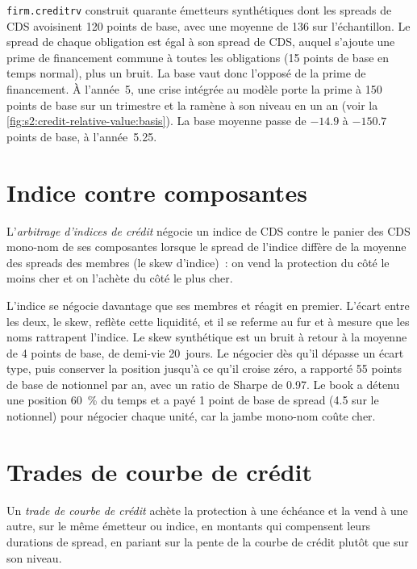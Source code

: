 \texttt{firm.creditrv} construit quarante émetteurs synthétiques dont les spreads de CDS avoisinent 120 points de base, avec une moyenne de 136 sur l'échantillon. Le spread de chaque obligation est égal à son
spread de CDS, auquel s'ajoute une prime de financement commune à toutes les obligations (15 points de base en temps normal), plus un bruit. La base vaut donc l'opposé de la prime de financement.
À l'année~5, une crise intégrée au modèle porte la prime à 150 points de base sur un trimestre et la ramène à son niveau en un an
(voir la \cref{fig:s2:credit-relative-value:basis}). La base moyenne passe de $-14.9$ à $-150.7$ points de base, à l'année~5.25.

\section{Indice contre composantes}

\begin{definition}\label{def:s2:credit-relative-value:index}
L'\emph{arbitrage d'indices de crédit} négocie un indice de CDS contre le panier des CDS mono-nom de ses composantes lorsque le spread de l'indice diffère de la
moyenne des spreads des membres (le skew d'indice)~: on vend la protection du côté le moins cher et on l'achète du côté le plus cher.
\end{definition}

L'indice se négocie davantage que ses membres et réagit en premier. L'écart entre les deux, le skew, reflète cette liquidité, et il se referme au fur et à mesure que les noms rattrapent l'indice.
Le skew synthétique est un bruit à retour à la moyenne de 4 points de base, de demi-vie 20~jours. Le négocier dès qu'il dépasse un écart type, puis conserver
la position jusqu'à ce qu'il croise zéro, a rapporté 55 points de base de notionnel par an, avec un ratio de Sharpe de 0.97. Le book a détenu une position 60~\% du temps et a payé 1
point de base de spread (4.5 sur le notionnel) pour négocier chaque unité, car la jambe mono-nom coûte cher.

\section{Trades de courbe de crédit}

\begin{definition}\label{def:s2:credit-relative-value:curve}
Un \emph{trade de courbe de crédit} achète la protection à une échéance et la vend à une autre, sur le même émetteur ou indice, en montants qui compensent leurs
durations de spread, en pariant sur la pente de la courbe de crédit plutôt que sur son niveau.
\end{definition}

